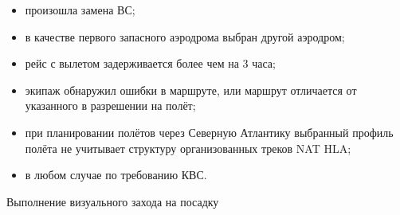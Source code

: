 \begin{itemize}
    \item произошла замена ВС; 
    \item в качестве первого запасного аэродрома выбран другой аэродром; 
    \item рейс с вылетом задерживается более чем на 3 часа; 
    \item экипаж обнаружил ошибки в маршруте, или маршрут отличается от указанного в разрешении на полёт; 
    \item при планировании полётов через Северную Атлантику выбранный профиль полёта не учитывает структуру организованных треков NAT HLA; 
    \item в любом случае по требованию КВС. 
\end{itemize}





\label{sec:visual}	Выполнение визуального захода на посадку


